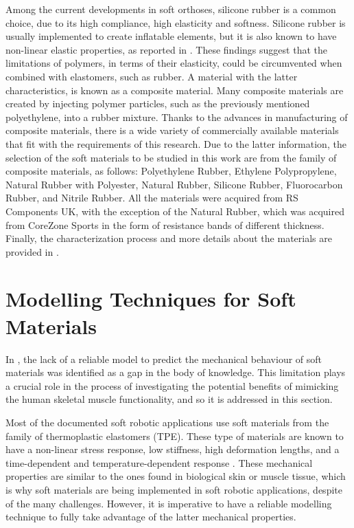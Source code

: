 Among the current developments in soft orthoses, silicone rubber is a common choice, due to its high compliance, high elasticity and softness. Silicone rubber is usually implemented to create inflatable elements, but it is also known to have non-linear elastic properties, as reported in \cite{roylance2008mechanical}. These findings suggest that the limitations of polymers, in terms of their elasticity, could be circumvented when combined with elastomers, such as rubber. A material with the latter characteristics, is known as a composite material. Many composite materials are created by injecting polymer particles, such as the previously mentioned polyethylene, into a rubber mixture. Thanks to the advances in manufacturing of composite materials, there is a wide variety of commercially available materials that fit with the requirements of this research. Due to the latter information, the selection of the soft materials to be studied in this work are from the family of composite materials, as follows: Polyethylene Rubber, Ethylene Polypropylene, Natural Rubber with Polyester, Natural Rubber, Silicone Rubber, Fluorocarbon Rubber, and Nitrile Rubber. All the materials were acquired from RS Components UK\textregistered{}, with the exception of the Natural Rubber, which was acquired from CoreZone Sports\textregistered{} in the form of resistance bands of different thickness. Finally, the characterization process and more details about the materials are provided in .

\section{Modelling Techniques for Soft Materials} \label{sec:modelingTechniques}

In , the lack of a reliable model to predict the mechanical behaviour of soft materials was identified as a gap in the body of knowledge. This limitation plays a crucial role in the process of investigating the potential benefits of mimicking the human skeletal muscle functionality, and so it is addressed in this section. 

Most of the documented soft robotic applications use soft materials from the family of thermoplastic elastomers (TPE). These type of materials are known to have a non-linear stress response, low stiffness, high deformation lengths, and a time-dependent and temperature-dependent response \cite{Bauman2008}. These mechanical properties are similar to the ones found in biological skin or muscle tissue, which is why soft materials are being implemented in soft robotic applications, despite of the many challenges. However, it is imperative to have a reliable modelling technique to fully take advantage of the latter mechanical properties.

